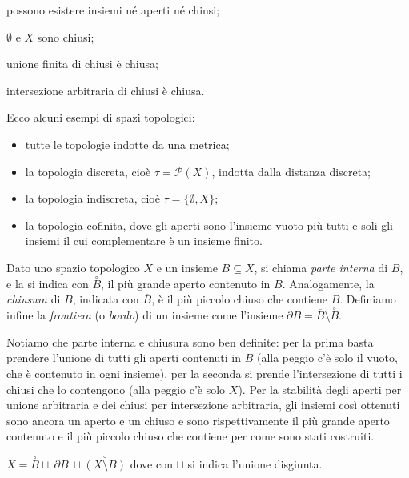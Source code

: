 \documentclass{article}
\begin{document}
\begin{oss}
\begin{nlist}
\item possono esistere insiemi né aperti né chiusi;
\item $\emptyset$ e $X$ sono chiusi;
\item unione finita di chiusi è chiusa;
\item intersezione arbitraria di chiusi è chiusa.
\end{nlist}
\end{oss}

\begin{ex}
Ecco alcuni esempi di spazi topologici:
\begin{itemize}
\item tutte le topologie indotte da una metrica;
\item la topologia discreta, cioè $\tau=\mathcal{P}(X)$, indotta dalla distanza
discreta;
\item la topologia indiscreta, cioè $\tau=\{ \emptyset, X \}$;
\item la topologia cofinita, dove gli aperti sono l'insieme vuoto più tutti e
soli gli insiemi il cui complementare è un insieme finito.
\end{itemize}
\end{ex}

\begin{defn}
	Dato uno spazio topologico $X$ e un insieme $B \subseteq X$, si chiama \textit{parte interna} di $B$, e la si indica con $\stackrel{\circ}{B}$, il più grande aperto contenuto in $B$. Analogamente, la \textit{chiusura} di $B$, indicata con $\overline{B}$, è il più piccolo chiuso che contiene $B$. Definiamo infine la \textit{frontiera} (o \textit{bordo}) di un insieme come l'insieme $\partial B= \overline{B} \setminus \stackrel{\circ}{B}$.
\end{defn}

Notiamo che parte interna e chiusura sono ben definite: per la prima basta prendere l'unione di tutti gli aperti contenuti in $B$ (alla peggio c'è solo il vuoto, che è contenuto in ogni insieme), per la seconda si prende l'intersezione di tutti i chiusi che lo contengono (alla peggio c'è solo $X$). Per la stabilità degli aperti per unione arbitraria e dei chiusi per intersezione arbitraria, gli insiemi così ottenuti sono ancora un aperto e un chiuso e sono rispettivamente il più grande aperto contenuto e il più piccolo chiuso che contiene per come sono stati costruiti.

\begin{ftt}
	$X= \stackrel{\circ}{B} \sqcup\ \partial B\ \sqcup \stackrel{\circ}{(X
	\setminus B)}$ dove con $\sqcup$ si indica l'unione disgiunta.
\end{ftt}
\end{document}
